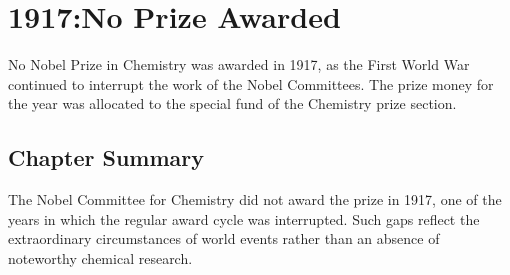 \chapter{1917:No Prize Awarded}
\label{chap:chemistry1917}

No Nobel Prize in Chemistry was awarded in 1917, as the First World War continued to interrupt the work of the Nobel Committees. The prize money for the year was allocated to the special fund of the Chemistry prize section.

\section*{Chapter Summary}

The Nobel Committee for Chemistry did not award the prize in 1917, one of the years in which the regular award cycle was interrupted. Such gaps reflect the extraordinary circumstances of world events rather than an absence of noteworthy chemical research.
